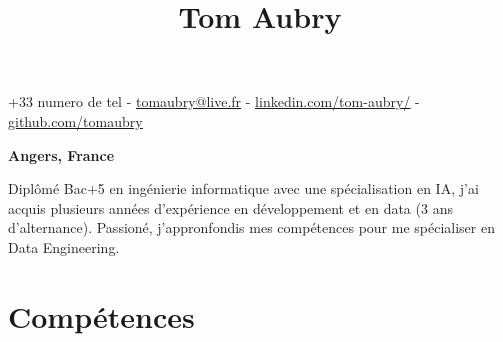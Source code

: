 \documentclass{article}
\title{Tom Aubry}
\date{}
\begin{document}
\maketitle
\thispagestyle{empty} %
\vspace{-6,5em}

\begin{center}
+33 numero de tel - \href{mailto:tomaubry@live.fr}{\underline{tomaubry@live.fr}} - \href{www.linkedin.com/in/tom-aubry-85b024209}{\underline{linkedin.com/tom-aubry/}} - \href{ https://github.com/tomaubry}{\underline{github.com/tomaubry}}
\end{center}
\begin{center}
\textbf{Angers, France}
\end{center}


\begin{center}
Diplômé Bac+5 en ingénierie informatique avec une spécialisation en IA, j’ai acquis plusieurs années d’expérience en développement et en data (3 ans d’alternance). Passioné, j'appronfondis mes compétences pour me spécialiser en Data Engineering.
\end{center}

\section*{Compétences}
\end{document}
